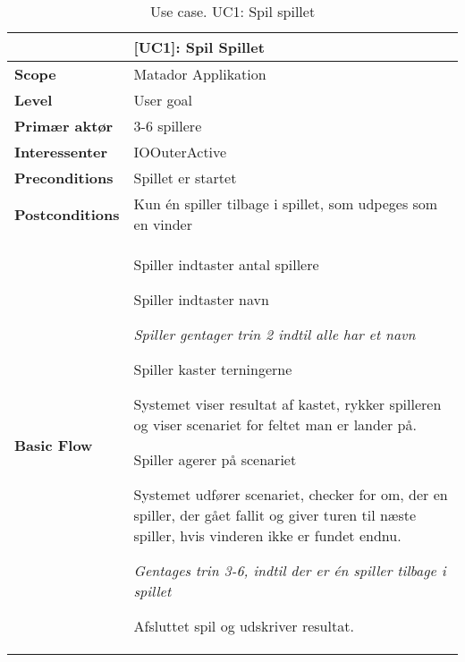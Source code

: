 \documentclass[class=article, crop=false]{standalone}
\makeatletter
\let\savespace\@minipagetrue
\makeatother
\begin{document}
    \begin{table}[H]
        \caption{Use case. UC1: Spil spillet}
        \begin{tabularx}{\textwidth}{|l|X|}
            \hline
                                         & \textbf{[UC1]: Spil Spillet}   \\ \hline
            \textbf{Scope}               & Matador Applikation\\ \hline
            \textbf{Level}               & User goal     \\ \hline
            \textbf{Primær aktør}        & 3-6 spillere  \\ \hline
            \textbf{Interessenter}       & IOOuterActive\\ \hline
            \textbf{Preconditions}       & Spillet er startet \\ \hline
            \textbf{Postconditions}      & Kun én spiller tilbage i spillet,
                                           som udpeges som en vinder\\ \hline





            \textbf{Basic Flow} & \begin{tabenum}
                          \item Spiller indtaster antal spillere
                          \item Spiller indtaster navn
                              \savespace
                                \begin{compactitem}
                                    \item \textit{Spiller gentager trin 2                                                             indtil alle har et navn}
                          \end{compactitem}
                              \item Spiller kaster terningerne
                              \item Systemet viser resultat af kastet, rykker spilleren og viser scenariet for feltet man er lander på.
                              \item Spiller agerer på scenariet
                              \item Systemet udfører scenariet, checker for om, der en spiller, der gået fallit og giver turen til næste spiller, hvis vinderen ikke er fundet endnu.
                          \savespace
                          \begin{compactitem}
                              \item \textit{Gentages trin 3-6, indtil der er én spiller tilbage i spillet}
                          \end{compactitem}
                              \item Afsluttet spil og udskriver resultat.
                           \end{tabenum}   \\ \hline





\end{tabularx}
\end{table}
\end{document}
